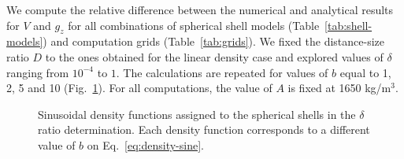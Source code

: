 \documentclass[extra, referee]{gji}
\begin{document}
We compute the relative difference between the numerical and analytical results for $V$
and $g_z$ for all combinations of spherical shell models (Table~\ref{tab:shell-models})
and computation grids (Table~\ref{tab:grids}).
We fixed the distance-size ratio $D$ to the ones obtained for the linear density case
and explored values of $\delta$ ranging from $10^{-4}$ to $1$.
The calculations are repeated for values of $b$ equal to 1, 2, 5 and 10
(Fig.~\ref{fig:sine-densities}).
For all computations, the value of $A$ is fixed at 1650 kg/m$^3$.

\begin{figure}
\centering
{}
\caption{
    Sinusoidal density functions assigned to the spherical shells in the $\delta$ ratio
    determination.
    Each density function corresponds to a different value of $b$ on
    Eq.~\ref{eq:density-sine}.
}
\label{fig:sine-densities}
\end{figure}
\end{document}
